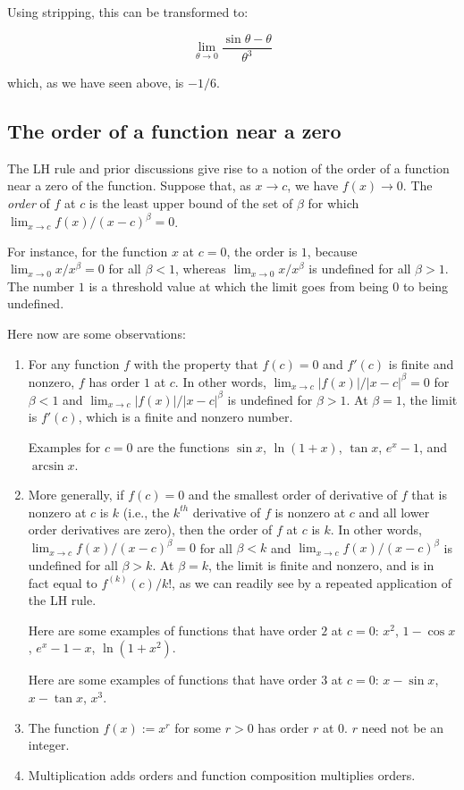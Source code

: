\documentclass{amsart}
\begin{document}
Using stripping, this can be transformed to:

$$\lim_{\theta \to 0} \frac{\sin \theta - \theta}{\theta^3}$$

which, as we have seen above, is $-1/6$.

\subsection{The order of a function near a zero}

The LH rule and prior discussions give rise to a notion of the order
of a function near a zero of the function. Suppose that, as $x \to c$,
we have $f(x) \to 0$. The {\em order} of $f$ at $c$ is the least
upper bound of the set of $\beta$ for which $\lim_{x \to c}
f(x)/(x-c)^\beta = 0$.

For instance, for the function $x$ at $c = 0$, the order is $1$,
because $\lim_{x \to 0} x/x^\beta = 0$ for all $\beta < 1$, whereas
$\lim_{x \to 0} x/x^\beta$ is undefined for all $\beta > 1$. The
number $1$ is a threshold value at which the limit goes from being $0$
to being undefined.

Here now are some observations:

\begin{enumerate}
\item For any function $f$ with the property that $f(c) = 0$ and
  $f'(c)$ is finite and nonzero, $f$ has order $1$ at $c$. In other
  words, $\lim_{x \to c} |f(x)|/|x-c|^\beta = 0$ for $\beta < 1$ and
  $\lim_{x \to c} |f(x)|/|x-c|^\beta$ is undefined for $\beta > 1$. At
  $\beta = 1$, the limit is $f'(c)$, which is a finite and nonzero
  number.

  Examples for $c = 0$ are the functions $\sin x$, $\ln(1 + x)$, $\tan
  x$, $e^x - 1$, and $\arcsin x$.
\item More generally, if $f(c) = 0$ and the smallest order of
  derivative of $f$ that is nonzero at $c$ is $k$ (i.e., the $k^{th}$
  derivative of $f$ is nonzero at $c$ and all lower order derivatives
  are zero), then the order of $f$ at $c$ is $k$. In other words,
  $\lim_{x \to c} f(x)/(x-c)^\beta = 0$ for all $\beta < k$ and
  $\lim_{x \to c} f(x)/(x-c)^\beta$ is undefined for all $\beta >
  k$. At $\beta = k$, the limit is finite and nonzero, and is in fact
  equal to $f^{(k)}(c)/k!$, as we can readily see by a repeated
  application of the LH rule.

  Here are some examples of functions that have order $2$ at $c = 0$:
  $x^2$, $1 - \cos x$, $e^x - 1 - x$, $\ln(1 + x^2)$.

  Here are some examples of functions that have order $3$ at $c = 0$:
  $x - \sin x$, $x - \tan x$, $x^3$.
\item The function $f(x) := x^r$ for some $r > 0$ has order $r$ at
  $0$. $r$ need not be an integer.
\item Multiplication adds orders and function composition multiplies orders. 
\end{enumerate}
\end{document}
